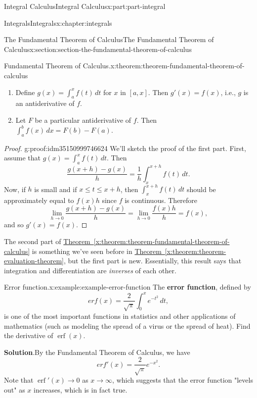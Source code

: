 \documentclass[twoside,10pt,]{book}
\newcommand{\blocktitlefont}{\relax}
\newcommand{\xreffont}{\relax}
\newcommand{\terminology}[1]{\textbf{#1}}
\numberwithin{equation}{part}
\newcommand{\erf}[1]{\operatorname{erf} #1}
\begin{document}
\begin{partptx}{Integral Calculus}{}{Integral Calculus}{}{}{x:part:part-integral}
\begin{chapterptx}{Integrals}{}{Integrals}{}{}{x:chapter:integrals}
\begin{sectionptx}{The Fundamental Theorem of Calculus}{}{The Fundamental Theorem of Calculus}{}{}{x:section:section-the-fundamental-theorem-of-calculus}
\begin{theorem}{Fundamental Theorem of Calculus.}{}{x:theorem:theorem-fundamental-theorem-of-calculus}
\begin{enumerate}
\item{}Define \(g(x) = \int_{a}^{x}f(t)\,dt\) for \(x\) in \([a,x]\). Then \(g'(x) = f(x)\), i.e., \(g\) is an antiderivative of \(f\).%
\item{}Let \(F\) be a particular antiderivative of \(f\). Then \(\int_{a}^{b}f(x)\,dx = F(b) - F(a).\)%
\end{enumerate}
\end{theorem}
\begin{proof}{}{g:proof:idm35150999746624}
We'll sketch the proof of the first part. First, assume that \(g(x) = \int_{a}^{x}f(t)\,dt\). Then%
\begin{equation*}
\frac{g(x+h)-g(x)}{h} = \frac{1}{h}\int_{x}^{x+h}f(t)\,dt.
\end{equation*}
Now, if \(h\) is small and if \(x\leq t\leq x+h\), then \(\int_{x}^{x+h}f(t)\,dt\) should be approximately equal to \(f(x)h\) since \(f\) is continuous. Therefore%
\begin{equation*}
\lim_{h\to0}\frac{g(x+h)-g(x)}{h} = \lim_{h\to0}\frac{f(x)h}{h} = f(x),
\end{equation*}
and so \(g'(x) = f(x)\).%
\end{proof}
The second part of \hyperref[x:theorem:theorem-fundamental-theorem-of-calculus]{Theorem~{\xreffont\ref{x:theorem:theorem-fundamental-theorem-of-calculus}}} is something we've seen before in \hyperref[x:theorem:theorem-evaluation-theorem]{Theorem~{\xreffont\ref{x:theorem:theorem-evaluation-theorem}}}, but the first part is new. Essentially, this result says that integration and differentiation are \emph{inverses} of each other.%
\begin{example}{Error function.}{x:example:example-error-function}%
The \terminology{error function}, defined by%
\begin{equation*}
erf(x) = \frac{2}{\sqrt{\pi}}\int_{0}^{x}e^{-t^{2}}\,dt,
\end{equation*}
is one of the most important functions in statistics and other applications of mathematics (such as modeling the spread of a virus or the spread of heat). Find the derivative of \(\erf(x)\).%
\par\smallskip%
\noindent\textbf{\blocktitlefont Solution}.\hypertarget{g:solution:idm35150999738816}{}\quad{}By the Fundamental Theorem of Calculus, we have%
\begin{equation*}
erf'(x) = \frac{2}{\sqrt{\pi}}e^{-x^{2}}.
\end{equation*}
Note that \(\erf'(x)\to0\) as \(x\to\infty\), which suggests that the error function "levels out" as \(x\) increases, which is in fact true.%

\end{example}
\end{sectionptx}
\end{chapterptx}
\end{partptx}
\end{document}

